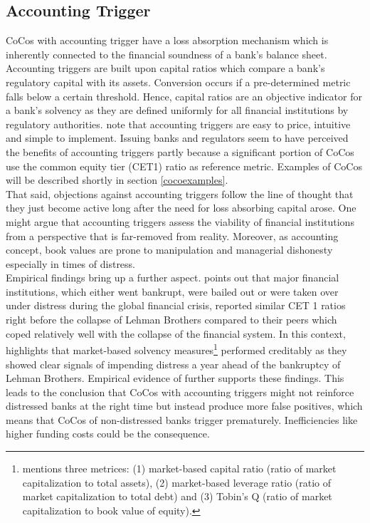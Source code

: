 \subsection{Accounting Trigger}\label{accountingtrigger}

CoCos with accounting trigger have a loss absorption mechanism which is inherently connected to the financial soundness of a bank's balance sheet. Accounting triggers are built upon capital ratios which compare a bank's regulatory capital with its assets. Conversion occurs if a pre-determined metric falls below a certain threshold. Hence, capital ratios are an objective indicator for a bank's solvency as they are defined uniformly for all financial institutions by regulatory authorities. \citep{de2014handbook} \citet{pazarbasioglu2011contingent} note that accounting triggers are easy to price, intuitive and simple to implement. Issuing banks and regulators seem to have perceived the benefits of accounting triggers partly because a significant portion of CoCos use the common equity tier (CET1) ratio as reference metric. Examples of CoCos will be described shortly in section \ref{cocoexamples}.\\

That said, objections against accounting triggers follow the line of thought that they just become active long after the need for loss absorbing capital arose. One might argue that accounting triggers assess the viability of financial institutions from a perspective that is far-removed from reality. \citep{de2011pricing} Moreover, as accounting concept, book values are prone to manipulation and managerial dishonesty especially in times of distress. \citep{mcdonald2013contingent}\\ 

Empirical findings bring up a further aspect. \citet{haldane2011capital} points out that major financial institutions, which either went bankrupt, were bailed out or were taken over under distress during the global financial crisis, reported similar CET 1 ratios right before the collapse of Lehman Brothers compared to their peers which coped relatively well with the collapse of the financial system. In this context, \citet{haldane2011capital} highlights that market-based solvency measures\footnote{\citet{haldane2011capital} mentions three metrices: (1) market-based capital ratio (ratio of market capitalization to total assets), (2) market-based leverage ratio (ratio of market capitalization to total debt) and (3) Tobin's Q (ratio of market capitalization to book value of equity).} performed creditably as they showed clear signals of impending distress a year ahead of the bankruptcy of Lehman Brothers. Empirical evidence of  further supports these findings. This leads to the conclusion that CoCos with accounting triggers might not reinforce distressed banks at the right time but instead produce more false positives, which means that CoCos of non-distressed banks trigger prematurely. Inefficiencies like higher funding costs could be the consequence. \citep{pazarbasioglu2011contingent}

